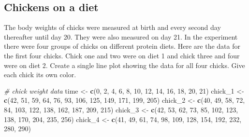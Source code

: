 \documentclass[]{book}
\newenvironment{Shaded}{\begin{snugshade}}{\end{snugshade}}
\newcommand{\CommentTok}[1]{\textcolor[rgb]{0.56,0.35,0.01}{\textit{#1}}}
\newcommand{\DecValTok}[1]{\textcolor[rgb]{0.00,0.00,0.81}{#1}}
\newcommand{\KeywordTok}[1]{\textcolor[rgb]{0.13,0.29,0.53}{\textbf{#1}}}
\newcommand{\NormalTok}[1]{#1}
\newcommand{\StringTok}[1]{\textcolor[rgb]{0.31,0.60,0.02}{#1}}
\begin{document}
\hypertarget{chickens-on-a-diet}{%
\subsection{Chickens on a diet}\label{chickens-on-a-diet}}

The body weights of chicks were measured at birth and every second day thereafter until day 20. They were also measured on day 21. In the experiment there were four groups of chicks on different protein diets. Here are the data for the first four chicks. Chick one and two were on diet 1 and chick three and four were on diet 2. Create a single line plot showing the data for all four chicks. Give each chick its own color.

\begin{Shaded}
\begin{Highlighting}[]
\CommentTok{# chick weight data}
\NormalTok{time <-}\StringTok{ }\KeywordTok{c}\NormalTok{(}\DecValTok{0}\NormalTok{, }\DecValTok{2}\NormalTok{, }\DecValTok{4}\NormalTok{, }\DecValTok{6}\NormalTok{, }\DecValTok{8}\NormalTok{, }\DecValTok{10}\NormalTok{, }\DecValTok{12}\NormalTok{, }\DecValTok{14}\NormalTok{, }\DecValTok{16}\NormalTok{, }\DecValTok{18}\NormalTok{, }\DecValTok{20}\NormalTok{, }\DecValTok{21}\NormalTok{)}
\NormalTok{chick_}\DecValTok{1}\NormalTok{ <-}\StringTok{ }\KeywordTok{c}\NormalTok{(}\DecValTok{42}\NormalTok{, }\DecValTok{51}\NormalTok{, }\DecValTok{59}\NormalTok{, }\DecValTok{64}\NormalTok{, }\DecValTok{76}\NormalTok{, }\DecValTok{93}\NormalTok{, }\DecValTok{106}\NormalTok{, }\DecValTok{125}\NormalTok{, }\DecValTok{149}\NormalTok{, }\DecValTok{171}\NormalTok{, }\DecValTok{199}\NormalTok{, }\DecValTok{205}\NormalTok{)}
\NormalTok{chick_}\DecValTok{2}\NormalTok{ <-}\StringTok{ }\KeywordTok{c}\NormalTok{(}\DecValTok{40}\NormalTok{, }\DecValTok{49}\NormalTok{, }\DecValTok{58}\NormalTok{, }\DecValTok{72}\NormalTok{, }\DecValTok{84}\NormalTok{, }\DecValTok{103}\NormalTok{, }\DecValTok{122}\NormalTok{, }\DecValTok{138}\NormalTok{, }\DecValTok{162}\NormalTok{, }\DecValTok{187}\NormalTok{, }\DecValTok{209}\NormalTok{, }\DecValTok{215}\NormalTok{)}
\NormalTok{chick_}\DecValTok{3}\NormalTok{ <-}\StringTok{ }\KeywordTok{c}\NormalTok{(}\DecValTok{42}\NormalTok{, }\DecValTok{53}\NormalTok{, }\DecValTok{62}\NormalTok{, }\DecValTok{73}\NormalTok{, }\DecValTok{85}\NormalTok{, }\DecValTok{102}\NormalTok{, }\DecValTok{123}\NormalTok{, }\DecValTok{138}\NormalTok{, }\DecValTok{170}\NormalTok{, }\DecValTok{204}\NormalTok{, }\DecValTok{235}\NormalTok{, }\DecValTok{256}\NormalTok{)}
\NormalTok{chick_}\DecValTok{4}\NormalTok{ <-}\StringTok{ }\KeywordTok{c}\NormalTok{(}\DecValTok{41}\NormalTok{, }\DecValTok{49}\NormalTok{, }\DecValTok{61}\NormalTok{, }\DecValTok{74}\NormalTok{, }\DecValTok{98}\NormalTok{, }\DecValTok{109}\NormalTok{, }\DecValTok{128}\NormalTok{, }\DecValTok{154}\NormalTok{, }\DecValTok{192}\NormalTok{, }\DecValTok{232}\NormalTok{, }\DecValTok{280}\NormalTok{, }\DecValTok{290}\NormalTok{)}
\end{Highlighting}
\end{Shaded}
\end{document}
